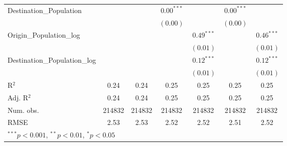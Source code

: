 \begin{table}
\begin{center}
\begin{tabular}{l c c c c c c }
		Destination\_Population      &               &               & $0.00^{***}$  &               & $0.00^{***}$  &               \\
		&               &               & $(0.00)$      &               & $(0.00)$      &               \\
		Origin\_Population\_log      &               &               &               & $0.49^{***}$  &               & $0.46^{***}$  \\
		&               &               &               & $(0.01)$      &               & $(0.01)$      \\
		Destination\_Population\_log &               &               &               & $0.12^{***}$  &               & $0.12^{***}$  \\
		&               &               &               & $(0.01)$      &               & $(0.01)$      \\
		\hline
		R$^2$                        & 0.24          & 0.24          & 0.25          & 0.25          & 0.25          & 0.25          \\
		Adj. R$^2$                   & 0.24          & 0.24          & 0.25          & 0.25          & 0.25          & 0.25          \\
		Num. obs.                    & 214832        & 214832        & 214832        & 214832        & 214832        & 214832        \\
		RMSE                         & 2.53          & 2.53          & 2.52          & 2.52          & 2.51          & 2.52          \\
		\hline
			\multicolumn{7}{l}{\scriptsize{$^{***}p<0.001$, $^{**}p<0.01$, $^*p<0.05$}}
		\end{tabular}
		\label{table:coefficients2018Q4}
	\end{center}
\end{table}



